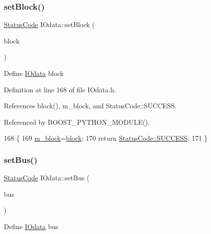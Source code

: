 \subsubsection{\texorpdfstring{set\+Block()}{setBlock()}}
{\footnotesize\ttfamily \hyperlink{classStatusCode}{Status\+Code} I\+Odata\+::set\+Block (\begin{DoxyParamCaption}\item[{\hyperlink{classIOdata_a96fb57f5fcd87b708743abd3c86a5198}{U32}}]{block }\end{DoxyParamCaption})\hspace{0.3cm}{\ttfamily [inline]}}

Define \hyperlink{classIOdata}{I\+Odata} block 

Definition at line 168 of file I\+Odata.\+h.



References block(), m\+\_\+block, and Status\+Code\+::\+S\+U\+C\+C\+E\+SS.



Referenced by B\+O\+O\+S\+T\+\_\+\+P\+Y\+T\+H\+O\+N\+\_\+\+M\+O\+D\+U\+L\+E().


\begin{DoxyCode}
168                                 \{
169     \hyperlink{classIOdata_a6d1ce9f88db6b97ce61098a3693e253f}{m\_block}=\hyperlink{classIOdata_aeda27840c9a9b7b3b86efc71c56cd868}{block};
170     \textcolor{keywordflow}{return} \hyperlink{classStatusCode_a6f565cbeadc76d14c72f047e5e85eb4badd0da38d3ba0d922efd1f4619bc37ad8}{StatusCode::SUCCESS};
171   \}
\end{DoxyCode}
\mbox{\label{classIOdata_aca154b90e490608b5b5c0ead58e1fafc}} 
\subsubsection{\texorpdfstring{set\+Bus()}{setBus()}}
{\footnotesize\ttfamily \hyperlink{classStatusCode}{Status\+Code} I\+Odata\+::set\+Bus (\begin{DoxyParamCaption}\item[{\hyperlink{classIOdata_a99aa7bed39364c4359ab8a7596bc013c}{I\+Odata\+::\+Bus}}]{bus }\end{DoxyParamCaption})\hspace{0.3cm}{\ttfamily [inline]}}

Define \hyperlink{classIOdata}{I\+Odata} bus 

